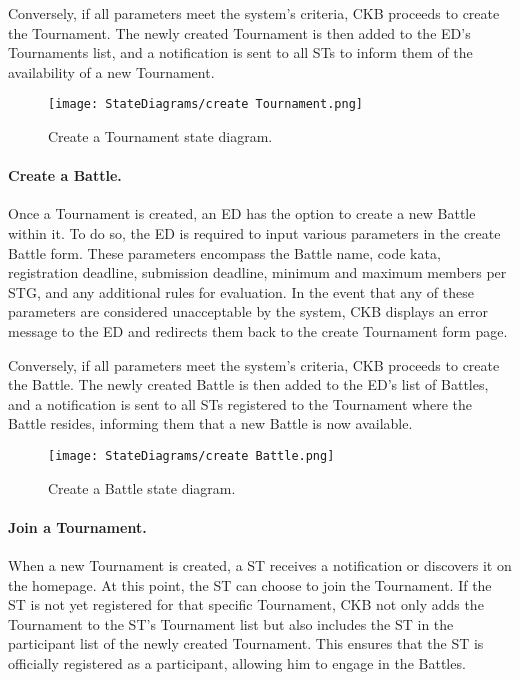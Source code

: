 Conversely, if all parameters meet the system's criteria, CKB proceeds to create the Tournament. The newly created Tournament is then added to the ED's Tournaments list, and a notification is sent to all STs to inform them of the availability of a new Tournament.

\begin{figure}[H]
    \begin{center}
        \texttt{[image: StateDiagrams/create Tournament.png]}
        \caption{Create a Tournament state diagram.}
        \label{fig:create_Tournament_sd}%
    \end{center}
\end{figure}

\paragraph{Create a Battle.}
Once a Tournament is created, an ED has the option to create a new Battle within it. To do so, the ED is required to input various parameters in the create Battle form. These parameters encompass the Battle name, code kata, registration deadline, submission deadline, minimum and maximum members per STG, and any additional rules for evaluation. In the event that any of these parameters are considered unacceptable by the system, CKB displays an error message to the ED and redirects them back to the create Tournament form page.

Conversely, if all parameters meet the system's criteria, CKB proceeds to create the Battle. The newly created Battle is then added to the ED's list of Battles, and a notification is sent to all STs registered to the Tournament where the Battle resides, informing them that a new Battle is now available.

\begin{figure}[H]
    \begin{center}
        \texttt{[image: StateDiagrams/create Battle.png]}
        \caption{Create a Battle state diagram.}
        \label{fig:create_Battle_sd}%
    \end{center}
\end{figure}

\paragraph{Join a Tournament.}
When a new Tournament is created, a ST receives a notification or discovers it on the homepage. At this point, the ST can choose to join the Tournament. If the ST is not yet registered for that specific Tournament, CKB not only adds the Tournament to the ST's Tournament list but also includes the ST in the participant list of the newly created Tournament. This ensures that the ST is officially registered as a participant, allowing him to engage in the Battles.

